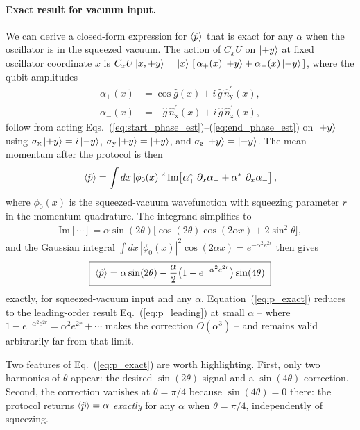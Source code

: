 \documentclass[aps,prx,showpacs,notitlepage,twocolumn,superscriptaddress,nofootinbib,preprintnumbers,floatfix,10pt, longbibliography]{revtex4-2}
\begin{document}
{\paragraph{Exact result for vacuum input.}
We can derive a closed-form expression for $\braket{\hat{p}}$ that is
exact for any $\alpha$ when the oscillator is in the squeezed vacuum.
The action of $C_xU$ on $\ket{+y}$ at fixed oscillator coordinate
$x$ is
$C_xU\ket{x,+y}=\ket{x}\,[\,\alpha_+(x)\ket{+y}+\alpha_-(x)\ket{-y}\,]$,
where the qubit amplitudes
\begin{align}
  \alpha_+(x) &= \cos\hat{g}(x) + i\,\hat{g}\,\hat{n}_\mathrm{y}^\prime(x), \nonumber\\
  \alpha_-(x) &= -\hat{g}\,\hat{n}_\mathrm{x}^\prime(x)
                 + i\,\hat{g}\,\hat{n}_\mathrm{z}^\prime(x),
\end{align}
follow from acting Eqs.~(\ref{eq:start_phase_est})--(\ref{eq:end_phase_est})
on $\ket{+y}$ using $\sigma_\mathrm{x}\ket{+y}=i\ket{-y}$,
$\sigma_\mathrm{y}\ket{+y}=\ket{+y}$, and
$\sigma_\mathrm{z}\ket{+y}=\ket{-y}$. The mean momentum after the
protocol is then
\begin{align}
  \braket{\hat{p}} = \int dx\,|\phi_0(x)|^2\,
    \mathrm{Im}\!\left[\alpha_+^*\,\partial_x\alpha_+
                       +\alpha_-^*\,\partial_x\alpha_-\right],
\end{align}
where $\phi_0(x)$ is the squeezed-vacuum wavefunction with squeezing
parameter $r$ in the momentum quadrature. The integrand simplifies to
\begin{align}
  \mathrm{Im}[\cdots] = \alpha\sin(2\theta)\bigl[
     \cos(2\theta)\cos(2\alpha x) + 2\sin^2\theta\bigr],
\end{align}
and the Gaussian integral
$\int dx\,|\phi_0(x)|^2\cos(2\alpha x) = e^{-\alpha^2 e^{2r}}$ then
gives
\begin{align}
  \boxed{\;\braket{\hat{p}} = \alpha\sin(2\theta)
    - \frac{\alpha}{2}\bigl(1-e^{-\alpha^2 e^{2r}}\bigr)\sin(4\theta)\;}
  \label{eq:p_exact}
\end{align}
exactly, for squeezed-vacuum input and any $\alpha$.
Equation~(\ref{eq:p_exact}) reduces to the leading-order result
Eq.~(\ref{eq:p_leading}) at small $\alpha$ -- where
$1-e^{-\alpha^2 e^{2r}}=\alpha^2 e^{2r}+\cdots$ makes the correction
$O(\alpha^3)$ -- and remains valid arbitrarily far from that limit.

Two features of Eq.~(\ref{eq:p_exact}) are worth highlighting. First,
only two harmonics of $\theta$ appear: the desired $\sin(2\theta)$
signal and a $\sin(4\theta)$ correction. Second, the correction
vanishes at $\theta=\pi/4$ because $\sin(4\theta)=0$ there: the
protocol returns $\braket{\hat{p}}=\alpha$ \emph{exactly} for any
$\alpha$ when $\theta=\pi/4$, independently of squeezing.

}
\end{document}
